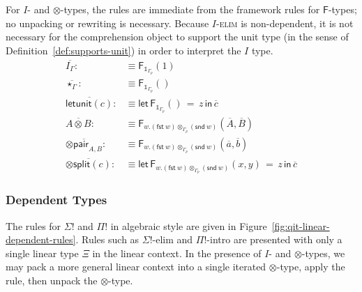 \documentclass[10pt]{article}
\theoremstyle{definition}
\newcommand\dsd[1]{\ensuremath{\mathsf{#1}}}
\newcommand{\app}[2]{\ensuremath{#1 \: #2}}
\newcommand{\fst}[1]{\app{\dsd{fst}}{#1}}
\newcommand{\snd}[1]{\app{\dsd{snd}}{#1}}
\newcommand\F[2]{\ensuremath{\mathsf{F}_{#1}(#2)}}
\newcommand\FEs[4]{\ensuremath{\mathsf{let} \, \mathsf{F}_{#1}(#3) \, = \, {#2} \, \mathsf{in} \, #4}}
\newcommand\FIs[2]{\ensuremath{\mathsf{F}_{#1}{(#2)}}}
\newcommand{\modeof}[1]{{#1}_p}
\newcommand{\upstairs}[1]{\overline{#1}}
\newcommand\One{\ensuremath{\mathds{1}}}
\newcommand\qunitmatch[1]{\ensuremath{\mathsf{letunit}(#1)}}
\newcommand\otimespair[1]{\ensuremath{\otimes\mathsf{pair}_{#1}}}
\newcommand\otimessplit[1]{\ensuremath{\otimes\mathsf{split}({#1})}}
\begin{document}
For $I$- and $\otimes$-types, the rules are immediate from the framework rules for $\mathsf{F}$-types; no unpacking or rewriting is necessary.  Because \textsc{$I$-elim} is non-dependent, it is not necessary for the comprehension object to support the unit type (in the sense of Definition~\ref{def:supports-unit}) in order to interpret the $I$ type.
\begin{align*}
\upstairs{I_\Gamma} :&\equiv \F{\One_{\modeof{\Gamma}}}{1} \\
\upstairs{\star_\Gamma} :&\equiv \FIs{\One_{\modeof{\Gamma}}}{} \\
\upstairs{\qunitmatch{c}} :&\equiv \FEs{\One_{\modeof{\Gamma}}}{z}{}{\upstairs{c}} \\
\upstairs{A \otimes B} :&\equiv \F{w. (\fst w) \otimes_{\modeof{\Gamma}} (\snd w)}{\upstairs{A}, \upstairs{B}} \\
\upstairs{\otimespair{A,B}} :&\equiv \FIs{w. (\fst w) \otimes_{\modeof{\Gamma}} (\snd w)}{\upstairs{a}, \upstairs{b}} \\
\upstairs{\otimessplit{c}} :&\equiv \FEs{w. (\fst w) \otimes_{\modeof{\Gamma}} (\snd w)}{z}{x, y}{\upstairs{c}}
\end{align*}

\subsubsection{Dependent Types}

The rules for $\Sigma!$ and $\Pi!$ in algebraic style are given in Figure~\ref{fig:qit-linear-dependent-rules}. Rules such as $\Sigma!$-elim and $\Pi!$-intro are presented with only a single linear type $\Xi$ in the linear context. In the presence of $I$- and $\otimes$-types, we may pack a more general linear context into a single iterated $\otimes$-type, apply the rule, then unpack the $\otimes$-type.
\end{document}
